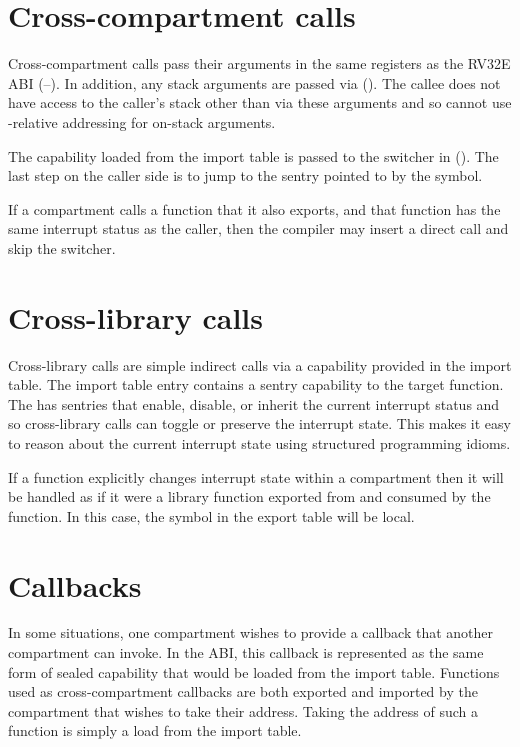 \section{Cross-compartment calls}
\label{sec:cross-compart-abi}

Cross-compartment calls pass their arguments in the same registers as the RV32E ABI (--).
In addition, any stack arguments are passed via  ().
The callee does not have access to the caller's stack other than via these arguments and so cannot use \CSP-relative addressing for on-stack arguments.

The capability loaded from the import table is passed to the switcher in  ().
The last step on the caller side is to jump to the sentry pointed to by the  symbol.

If a compartment calls a function that it also exports, and that function has the same interrupt status as the caller, then the compiler may insert a direct call and skip the switcher.


\section{Cross-library calls}

Cross-library calls are simple indirect calls via a capability provided in the import table.
The import table entry contains a sentry capability to the target function.
The \cherimcuisa{} has sentries that enable, disable, or inherit the current interrupt status and so cross-library calls can toggle or preserve the interrupt state.
This makes it easy to reason about the current interrupt state using structured programming idioms.

If a function explicitly changes interrupt state within a compartment then it will be handled as if it were a library function exported from and consumed by the function.
In this case, the symbol in the export table will be local.

\section{Callbacks}

In some situations, one compartment wishes to provide a callback that another compartment can invoke.
In the \cherimcu{} ABI, this callback is represented as the same form of sealed capability that would be loaded from the import table.
Functions used as cross-compartment callbacks are both exported and imported by the compartment that wishes to take their address.
Taking the address of such a function is simply a load from the import table.

